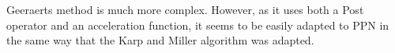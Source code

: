 Geeraerts method is much more complex.
However, as it uses both a Post operator and an acceleration function, it seems to be easily adapted to \ac{PPN} in the same way that the Karp and Miller algorithm was adapted.

